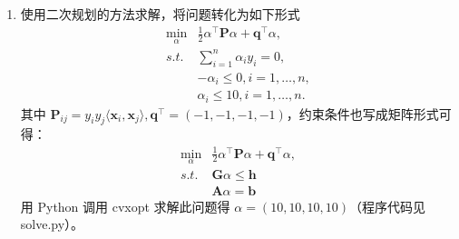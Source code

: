 \documentclass[11pt,letter,notitlepage]{article}
\begin{document}
\begin{solution}
\begin{enumerate}
\begin{enumerate}
		\end{enumerate}
		\item 使用二次规划的方法求解，将问题转化为如下形式
		\begin{align*}
			\min_{\alpha} &\frac{1}{2} \alpha^{\top}\mathbf{P}\alpha + \mathbf{q}^{\top}\alpha,\\
			s.t. &\sum\limits_{i=1}^n \alpha_iy_i = 0,\\
			&-\alpha_i \leqslant 0, i= 1,\dots, n,\\
			&\alpha_i \leqslant 10, i= 1,\dots, n.
		\end{align*}
		其中 $\mathbf{P}_{ij} = y_iy_j\langle\mathbf{x}_i,\mathbf{x}_j\rangle, \mathbf{q}^{\top} = (-1, -1, -1, -1)$，约束条件也写成矩阵形式可得：
		\begin{align*}
			\min_{\alpha} &\frac{1}{2} \alpha^{\top}\mathbf{P}\alpha + \mathbf{q}^{\top}\alpha,\\
			s.t. &\mathbf{G}\alpha \leqslant \mathbf{h}\\
			&\mathbf{A}\alpha = \mathbf{b}
		\end{align*}
		用 Python 调用 cvxopt 求解此问题得 $\alpha = (10, 10, 10, 10)$（程序代码见 solve.py）。
	\end{enumerate}
\end{solution}

\end{document}
